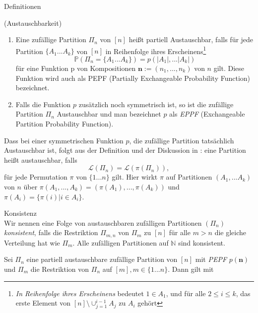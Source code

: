 \begin{section}{Definitionen}
\begin{Definition}
\end{Definition}
\begin{Definition}
    \textnormal{(Austauschbarkeit)}
    \label{Austauschbarkeit}
    \begin{enumerate}
        \item Eine zufällige Partition $\Pi_n$ von $[n]$ heißt partiell Austauschbar, falls für jede Partition $\{ A_1 ... A_k\}$ von $[n]$ in Reihenfolge ihres Erscheinens\footnote{\textit{In Reihenfolge ihres Erscheinens} bedeutet $1 \in A_1$, und für alle $2 \leq i \leq k$, das erste Element von $[n]\setminus \cup_{j=1}^{i-1}A_j$ zu $A_i$ gehört}
        \[ 
            \mathbb{P}(\Pi_n = \{ A_1 ... A_k\}) = p(|A_1|, ... |A_k|)
        \]  
        für eine Funktion p von Kompositionen $\textbf{n}:= (n_1, ..., n_k)$ von $n$ gilt. Diese Funktion wird auch als PEPF (Partially Exchangeable Probability Function) bezeichnet.
        \item Falls die Funktion $p$ zusätzlich noch symmetrisch ist, so ist die zufällige Partition $\Pi_n$ Austauschbar und man bezeichnet $p$ als \textit{EPPF} (Exchangeable Partition Probability Function).
    \end{enumerate}
\end{Definition}
\begin{Bemerkung}
    Dass bei einer symmetrischen Funktion $p$, die zufällige Partition tatsächlich Austauschbar ist, folgt aus der Definition und der Diskussion in \cite[Seite 85]{aldous2006ecole}: eine Partition heißt austauschbar, falls 
    \[
         \mathcal{L}(\Pi_n) = \mathcal{L}(\pi(\Pi_{n})),
    \]
    für jede Permutation $\pi$ von $\{1...n\}$ gilt. Hier wirkt $\pi$ auf Partitionen $(A_1,...A_k)$ von $n$ über $\pi(A_1,...,A_k) =(\pi(A_1),...,\pi(A_k)) $ und $\pi(A_i) = \{\pi(i) | i \in A_i\}$.
\end{Bemerkung}
\begin{Definition}{Konsistenz}\\
    Wir nennen eine Folge von austauschbaren zufälligen Partitionen $(\Pi_n)$ \textit{konsistent}, falls die Restriktion $\Pi_{m,n}$ von $\Pi_m$ zu $[n]$ für alle $m > n$ die gleiche Verteilung hat wie $\Pi_m$. Alle zufälligen Partitionen auf $\mathbb{N}$ sind konsistent.
\end{Definition}
\begin{lemma}
    \label{lemma partielle austauschbarkeit}
    Sei $\Pi_n$ eine partiell austauschbare zufällige Partition von $[n]$ mit \textit{PEPF} $p(\textbf{n})$ und $\Pi_m$ die Restriktion von $\Pi_n$ auf $[m], m \in \{1...n\}$. Dann gilt mit 

\end{lemma}
\end{section}
